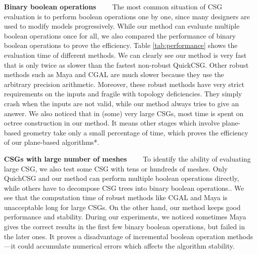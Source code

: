 \documentclass[10pt,journal,compsoc]{IEEEtran}
\begin{document}
\vspace{0.5em}
\noindent\textbf{Binary boolean operations}~~~~
The most common situation of CSG evaluation is to perform boolean operations one by one, since many designers are used to modify models progressively. While our method can evaluate multiple boolean operations once for all, we also compared the performance of binary boolean operations to prove the efficiency. Table \ref{tab:performance} shows the evaluation time of different methods. We can clearly see our method is very fast that is only twice as slower than the fastest non-robust QuickCSG. Other robust methods such as Maya and CGAL are much slower because they use the arbitrary precision arithmetic. Moreover, these robust methods have very strict requirements on the inputs and fragile with topology deficiencies. They simply crash when the inputs are not valid, while our method always tries to give an answer. We also noticed that in (some) very large CSGs, most time is spent on octree construction in our method. It means other stages which involve plane-based geometry take only a small percentage of time, which proves the efficiency of our plane-based algorithms*.


\vspace{0.5em}
\noindent\textbf{CSGs with large number of meshes}~~~~
To identify the ability of evaluating large CSG, we also test some CSG with tens or hundreds of meshes. Only QuichCSG and our method can perform multiple boolean operations directly, while others have to decompose CSG trees into binary boolean operations.. We see that the computation time of robust methods like CGAL and Maya is unacceptable long for large CSGs. On the other hand, our method keeps good performance and stability. During our experiments, we noticed sometimes Maya gives the correct results in the first few binary boolean operations, but failed in the later ones. It proves a disadvantage of incremental boolean operation methods---it could accumulate numerical errors which affects the algorithm stability.
\end{document}
